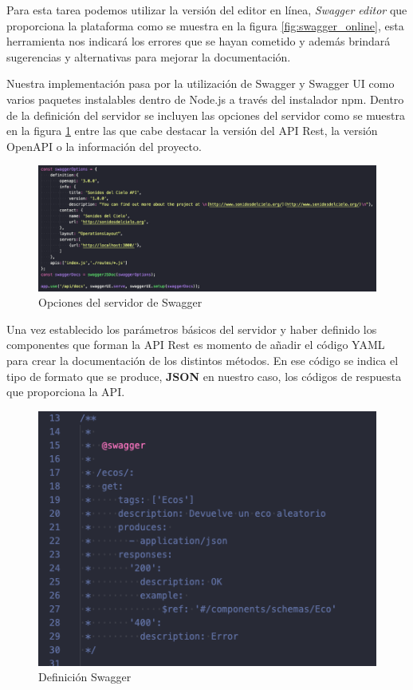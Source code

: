 Para esta tarea podemos utilizar la versión del editor en línea, \textit{Swagger editor} que proporciona la plataforma como se muestra en la figura \ref{fig:swagger_online}, esta herramienta nos indicará los errores que se hayan cometido y además brindará sugerencias y alternativas para mejorar la documentación.

Nuestra implementación pasa por la utilización de Swagger y Swagger UI como varios paquetes instalables dentro de Node.js \cite{DocumentWithSwagger} a través del instalador npm. Dentro de la definición del servidor se incluyen las opciones del servidor como se muestra en la figura \ref{fig:swagger_options} entre las que cabe destacar la versión del API Rest, la versión OpenAPI o la información del proyecto.

\begin{figure}[H]
    \centering
    \includegraphics[width=\textwidth]{include/capturas/SwaggerOptions.png}
    \caption{Opciones del servidor de Swagger}
    \label{fig:swagger_options}
\end{figure}

Una vez establecido los parámetros básicos del servidor y haber definido los componentes que forman la API Rest es momento de añadir el código YAML \cite{AutomaticAPIDocumentation} para crear la documentación de los distintos métodos. En ese código se indica el tipo de formato que se produce, \textbf{JSON} en nuestro caso, los códigos de respuesta que proporciona la API.

\begin{figure}[h]
    \centering
    \includegraphics[scale=0.7]{include/capturas/SwaggerYAML.png}
    \caption{Definición Swagger}
    \label{fig:swagger_definition}
\end{figure}

